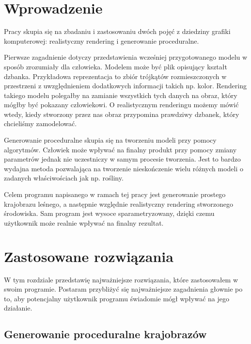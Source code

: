 \documentclass[inz,longabstract]{iithesis}
\author         {Bartosz Rudzki}
\begin{document}
\chapter{Wprowadzenie}
    Pracy skupia się na zbadaniu i zastosowaniu dwóch pojęć z dziedziny grafiki komputerowej: realistyczny rendering i generowanie proceduralne. 
    
    Pierwsze zagadnienie dotyczy przedstawienia wcześniej przygotowanego modelu w sposób zrozumiały dla człowieka. Modelem może być plik opisujący kształt dzbanka. Przykładowa reprezentacja to zbiór trójkątów rozmieszczonych w przestrzeni z uwzględnieniem dodatkowych informacji takich np. kolor. Rendering takiego modelu polegałby na zamianie wszystkich tych danych na obraz, który mógłby być pokazany człowiekowi. O realistycznym renderingu możemy mówić wtedy, kiedy stworzony przez nas obraz przypomina prawdziwy dzbanek, który chcieliśmy zamodelować. 
    
    Generowanie proceduralne skupia się na tworzeniu modeli przy pomocy algorytmów. Człowiek może wpływać na finalny produkt przy pomocy zmiany parametrów jednak nie uczestniczy w samym procesie tworzenia. Jest to bardzo wydajna metoda pozwalająca na tworzenie nieskończenie wielu różnych modeli o zadanych właściwościach jak np. rośliny.
    
    Celem programu napisanego w ramach tej pracy jest generowanie prostego krajobrazu leśnego, a następnie względnie realistyczny rendering stworzonego środowiska. Sam program jest wysoce sparametryzowany, dzięki czemu użytkownik może realnie wpływać na finalny rezultat.
    
\chapter{Zastosowane rozwiązania}
    W tym rozdziale przedstawię najważniejsze rozwiązania, które zastosowałem w swoim programie. Postaram przybliżyć się najważniejsze zagadnienia głownie po to, aby potencjalny użytkownik programu świadomie mógł wpływać na jego działanie. 
    
    \section{Generowanie proceduralne krajobrazów}
\end{document}
